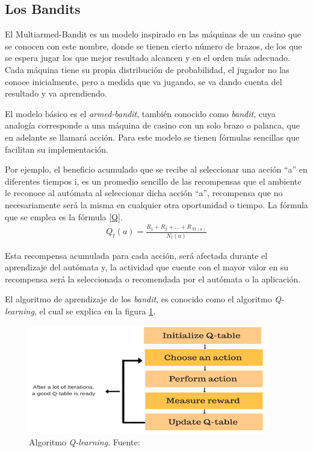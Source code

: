 \subsection{Los Bandits}
\label{Los Bandits}

El Multiarmed-Bandit es un modelo inspirado en las máquinas de un casino que se conocen con este nombre, donde se tienen cierto número de brazos, de los que se espera jugar los que mejor resultado alcancen y en el orden más adecuado. Cada máquina tiene su propia distribución de probabilidad, el jugador no las conoce inicialmente, pero a medida que va jugando, se va dando cuenta del resultado y va aprendiendo.

El modelo básico es el \textit{armed-bandit}, también conocido como \textit{bandit}, cuya analogía corresponde a una máquina de casino con un solo brazo o palanca, que en adelante se llamará acción. Para este modelo se tienen fórmulas sencillas que facilitan su implementación.

Por ejemplo, el beneficio acumulado que se recibe al seleccionar una acción “a” en diferentes tiempos i, es un promedio sencillo de las recompensas que el ambiente le reconoce al autómata al seleccionar dicha acción “a”, recompensa que no necesariamente será la misma en cualquier otra oportunidad o tiempo. La fórmula que se emplea es la fórmula \ref{Q}.
\begin{eqnarray}\label{Q}
Q_t(a) = \frac{R_1+R_2+ ...+R_{Nt(a)}}{N_t(a)}
\end{eqnarray}

Esta recompensa acumulada para cada acción, será afectada durante el aprendizaje del autómata y, la actividad que cuente con el mayor valor en su recompensa será la seleccionada o recomendada por el autómata o la aplicación.

El algoritmo de aprendizaje de los \textit{bandit}, es conocido como el algoritmo \textit{Q-learning}, el cual se explica en la figura \ref{AlgQ}.

\begin{figure}
  \centering
    \includegraphics{Qlearning}
  \caption{Algoritmo \textit{Q-learning}. Fuente: \citep{ADL2018}}
  \label{AlgQ}
\end{figure}

